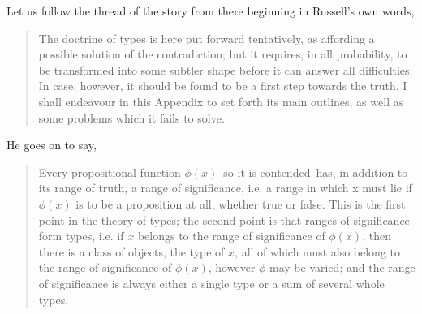 \documentclass[dah,phd,a4paper]{xe_uccthesis}
\begin{document}
Let us follow the thread of the story from there beginning in Russell's own words,
\begin{quotation}
The doctrine of types is here put forward tentatively, as affording a possible solution of the contradiction; but it requires, in all probability, to be transformed into some subtler shape before it can answer all difficulties. In case, however, it should be found to be a first step towards the truth, I shall endeavour in this Appendix to set forth its main outlines, as well as some problems which it fails to solve.
\end{quotation}

He goes on to say,
\begin{quotation}
Every propositional function $\phi(x)$--so it is contended--has, in addition to its range of truth, a range of significance, i.e. a range in which x must lie if $\phi(x)$ is to be a proposition at all, whether true or false. This is the first point in the theory of types; the second point is that ranges of significance form types, i.e. if $x$ belongs to the range of significance of $\phi(x)$, then there is a class of objects, the type of $x$, all of which must also belong to the range of significance of $\phi(x)$, however $\phi$ may be varied; and the range of significance is always either a single type or a sum of several whole types.
\end{quotation}
\end{document}
